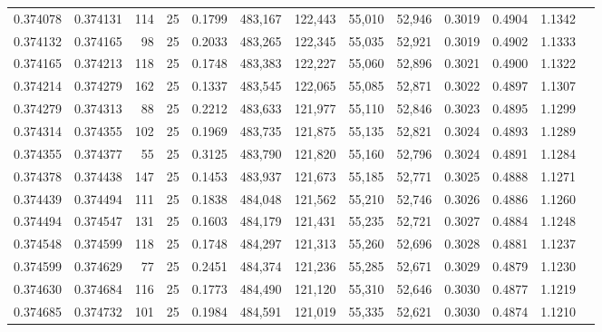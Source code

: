\begin{tabular}{rrrrrrrrrrrrr}
0.374078 & 0.374131 &   114 &  25 &                                     0.1799 & 483,167 & 122,443 &  55,010 &  52,946 & 0.3019 & 0.4904 & 1.1342 \\
0.374132 & 0.374165 &    98 &  25 &                                     0.2033 & 483,265 & 122,345 &  55,035 &  52,921 & 0.3019 & 0.4902 & 1.1333 \\
0.374165 & 0.374213 &   118 &  25 &                                     0.1748 & 483,383 & 122,227 &  55,060 &  52,896 & 0.3021 & 0.4900 & 1.1322 \\
0.374214 & 0.374279 &   162 &  25 &                                     0.1337 & 483,545 & 122,065 &  55,085 &  52,871 & 0.3022 & 0.4897 & 1.1307 \\
0.374279 & 0.374313 &    88 &  25 &                                     0.2212 & 483,633 & 121,977 &  55,110 &  52,846 & 0.3023 & 0.4895 & 1.1299 \\
0.374314 & 0.374355 &   102 &  25 &                                     0.1969 & 483,735 & 121,875 &  55,135 &  52,821 & 0.3024 & 0.4893 & 1.1289 \\
0.374355 & 0.374377 &    55 &  25 &                                     0.3125 & 483,790 & 121,820 &  55,160 &  52,796 & 0.3024 & 0.4891 & 1.1284 \\
0.374378 & 0.374438 &   147 &  25 &                                     0.1453 & 483,937 & 121,673 &  55,185 &  52,771 & 0.3025 & 0.4888 & 1.1271 \\
0.374439 & 0.374494 &   111 &  25 &                                     0.1838 & 484,048 & 121,562 &  55,210 &  52,746 & 0.3026 & 0.4886 & 1.1260 \\
0.374494 & 0.374547 &   131 &  25 &                                     0.1603 & 484,179 & 121,431 &  55,235 &  52,721 & 0.3027 & 0.4884 & 1.1248 \\
0.374548 & 0.374599 &   118 &  25 &                                     0.1748 & 484,297 & 121,313 &  55,260 &  52,696 & 0.3028 & 0.4881 & 1.1237 \\
0.374599 & 0.374629 &    77 &  25 &                                     0.2451 & 484,374 & 121,236 &  55,285 &  52,671 & 0.3029 & 0.4879 & 1.1230 \\
0.374630 & 0.374684 &   116 &  25 &                                     0.1773 & 484,490 & 121,120 &  55,310 &  52,646 & 0.3030 & 0.4877 & 1.1219 \\
0.374685 & 0.374732 &   101 &  25 &                                     0.1984 & 484,591 & 121,019 &  55,335 &  52,621 & 0.3030 & 0.4874 & 1.1210 \\

\end{tabular}
